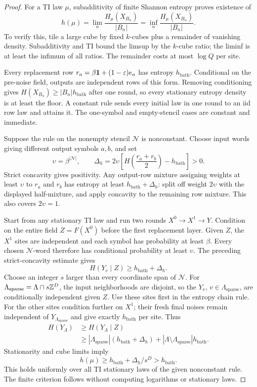 \begin{proof}
For a TI law $\mu$, subadditivity of finite Shannon entropy proves existence of
\[
 h(\mu)=\lim_n\frac{H_\mu(X_{B_n})}{|B_n|}
       =\inf_n\frac{H_\mu(X_{B_n})}{|B_n|}.
\]
To verify this, tile a large cube by fixed $k$-cubes plus a remainder of vanishing density. Subadditivity and TI bound the limsup by the $k$-cube ratio; the liminf is at least the infimum of all ratios. The remainder costs at most $\log Q$ per site.

Every replacement row $r_a=\beta\mathbf 1+(1-\varepsilon)e_a$ has entropy $h_{\mathrm{bath}}$. Conditional on the pre-noise field, outputs are independent rows of this form. Removing conditioning gives
$H(X_{B_n})\ge|B_n|h_{\mathrm{bath}}$ after one round, so every stationary entropy density is at least the floor. A constant rule sends every initial law in one round to an iid row law and attains it. The one-symbol and empty-stencil cases are constant and immediate.

Suppose the rule on the nonempty stencil $\mathcal N$ is nonconstant. Choose input words giving different output symbols $a,b$, and set
\[
 \upsilon=\beta^{|\mathcal N|},\qquad
 \Delta_h=2\upsilon\left[H\left(\frac{r_a+r_b}{2}\right)-h_{\mathrm{bath}}\right]>0.
\]
Strict concavity gives positivity. Any output-row mixture assigning weights at least $\upsilon$ to $r_a$ and $r_b$ has entropy at least $h_{\mathrm{bath}}+\Delta_h$: split off weight $2\upsilon$ with the displayed half-mixture, and apply concavity to the remaining row mixture. This also covers $2\upsilon=1$.

Start from any stationary TI law and run two rounds $X^0\to X^1\to Y$. Condition on the entire field $Z=F(X^0)$ before the first replacement layer. Given $Z$, the $X^1$ sites are independent and each symbol has probability at least $\beta$. Every chosen $\mathcal N$-word therefore has conditional probability at least $\upsilon$. The preceding strict-concavity estimate gives
\[
 H(Y_v\mid Z)\ge h_{\mathrm{bath}}+\Delta_h.
\]
Choose an integer $s$ larger than every coordinate span of $\mathcal N$. For $\Lambda_{\mathrm{sparse}}=\Lambda\cap s\mathbb Z^D$, the input neighborhoods are disjoint, so the $Y_v$, $v\in \Lambda_{\mathrm{sparse}}$, are conditionally independent given $Z$. Use these sites first in the entropy chain rule. For the other sites condition further on $X^1$; their fresh final noises remain independent of $Y_{\Lambda_{\mathrm{sparse}}}$ and give exactly $h_{\mathrm{bath}}$ per site. Thus
\begin{align*}
 H(Y_\Lambda)&\ge H(Y_\Lambda\mid Z)\\
 &\ge |\Lambda_{\mathrm{sparse}}|(h_{\mathrm{bath}}+\Delta_h)
       +|\Lambda\setminus \Lambda_{\mathrm{sparse}}|h_{\mathrm{bath}}.
\end{align*}
Stationarity and cube limits imply
\[
 h(\mu)\ge h_{\mathrm{bath}}+\Delta_h/s^D>h_{\mathrm{bath}}.
\]
This holds uniformly over all TI stationary laws of the given nonconstant rule. The finite criterion follows without computing logarithms or stationary laws.
\end{proof}

